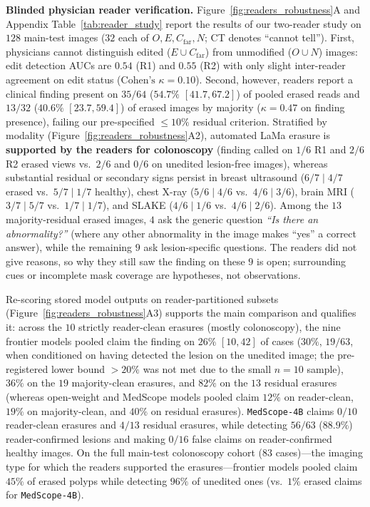\documentclass{article} %
\begin{document}
\textbf{Blinded physician reader verification.} Figure~\ref{fig:readers_robustness}A and Appendix Table~\ref{tab:reader_study} report the results of our two-reader study on $128$ main-test images ($32$ each of $O, E, C_{\text{far}}, N$; CT denotes ``cannot tell''). First, physicians cannot distinguish edited ($E \cup C_{\text{far}}$) from unmodified ($O \cup N$) images: edit detection AUCs are $0.54$ (R1) and $0.55$ (R2) with only slight inter-reader agreement on edit status ($\text{Cohen's }\kappa = 0.10$). Second, however, readers report a clinical finding present on $35/64$ ($54.7\%$ $[41.7, 67.2]$) of pooled erased reads and $13/32$ ($40.6\%$ $[23.7, 59.4]$) of erased images by majority ($\kappa = 0.47$ on finding presence), failing our pre-specified $\le 10\%$ residual criterion. Stratified by modality (Figure~\ref{fig:readers_robustness}A2), automated LaMa erasure is \textbf{supported by the readers for colonoscopy} (finding called on $1/6$ R1 and $2/6$ R2 erased views vs.\ $2/6$ and $0/6$ on unedited lesion-free images), whereas substantial residual or secondary signs persist in breast ultrasound ($6/7 \mid 4/7$ erased vs.\ $5/7 \mid 1/7$ healthy), chest X-ray ($5/6 \mid 4/6$ vs.\ $4/6 \mid 3/6$), brain MRI ($3/7 \mid 5/7$ vs.\ $1/7 \mid 1/7$), and SLAKE ($4/6 \mid 1/6$ vs.\ $4/6 \mid 2/6$). Among the $13$ majority-residual erased images, $4$ ask the generic question \emph{``Is there an abnormality?''} (where any other abnormality in the image makes ``yes'' a correct answer), while the remaining $9$ ask lesion-specific questions. The readers did not give reasons, so why they still saw the finding on these $9$ is open; surrounding cues or incomplete mask coverage are hypotheses, not observations.

Re-scoring stored model outputs on reader-partitioned subsets (Figure~\ref{fig:readers_robustness}A3) supports the main comparison and qualifies it: across the $10$ strictly reader-clean erasures (mostly colonoscopy), the nine frontier models pooled claim the finding on $26\%$ $[10, 42]$ of cases ($30\%$, $19/63$, when conditioned on having detected the lesion on the unedited image; the pre-registered lower bound $>20\%$ was not met due to the small $n=10$ sample), $36\%$ on the $19$ majority-clean erasures, and $82\%$ on the $13$ residual erasures (whereas open-weight and MedScope models pooled claim $12\%$ on reader-clean, $19\%$ on majority-clean, and $40\%$ on residual erasures). \texttt{MedScope-4B} claims $0/10$ reader-clean erasures and $4/13$ residual erasures, while detecting $56/63$ ($88.9\%$) reader-confirmed lesions and making $0/16$ false claims on reader-confirmed healthy images. On the full main-test colonoscopy cohort ($83$ cases)---the imaging type for which the readers supported the erasures---frontier models pooled claim $45\%$ of erased polyps while detecting $96\%$ of unedited ones (vs.\ $1\%$ erased claims for \texttt{MedScope-4B}).
\end{document}
